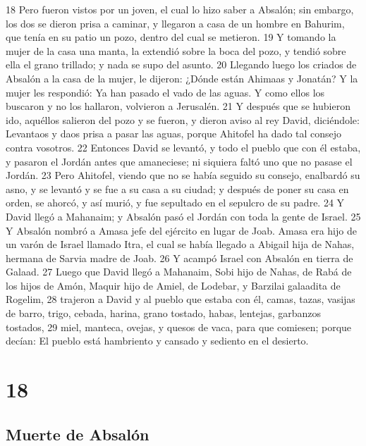 18 Pero fueron vistos por un joven, el cual lo hizo saber a Absalón; sin embargo, los dos se dieron prisa a caminar, y llegaron a casa de un hombre en Bahurim, que tenía en su patio un pozo, dentro del cual se metieron.
19 Y tomando la mujer de la casa una manta, la extendió sobre la boca del pozo, y tendió sobre ella el grano trillado; y nada se supo del asunto.
20 Llegando luego los criados de Absalón a la casa de la mujer, le dijeron: ¿Dónde están Ahimaas y Jonatán? Y la mujer les respondió: Ya han pasado el vado de las aguas. Y como ellos los buscaron y no los hallaron, volvieron a Jerusalén.
21 Y después que se hubieron ido, aquéllos salieron del pozo y se fueron, y dieron aviso al rey David, diciéndole: Levantaos y daos prisa a pasar las aguas, porque Ahitofel ha dado tal consejo contra vosotros.
22 Entonces David se levantó, y todo el pueblo que con él estaba, y pasaron el Jordán antes que amaneciese; ni siquiera faltó uno que no pasase el Jordán.
23 Pero Ahitofel, viendo que no se había seguido su consejo, enalbardó su asno, y se levantó y se fue a su casa a su ciudad; y después de poner su casa en orden, se ahorcó, y así murió, y fue sepultado en el sepulcro de su padre. 
24 Y David llegó a Mahanaim; y Absalón pasó el Jordán con toda la gente de Israel.
25 Y Absalón nombró a Amasa jefe del ejército en lugar de Joab. Amasa era hijo de un varón de Israel llamado Itra, el cual se había llegado a Abigail hija de Nahas, hermana de Sarvia madre de Joab.
26 Y acampó Israel con Absalón en tierra de Galaad.
27 Luego que David llegó a Mahanaim, Sobi hijo de Nahas, de Rabá de los hijos de Amón, Maquir hijo de Amiel, de Lodebar, y Barzilai galaadita de Rogelim,
28 trajeron a David y al pueblo que estaba con él, camas, tazas, vasijas de barro, trigo, cebada, harina, grano tostado, habas, lentejas, garbanzos tostados,
29 miel, manteca, ovejas, y quesos de vaca, para que comiesen; porque decían: El pueblo está hambriento y cansado y sediento en el desierto.

\chapter{18}

\section*{Muerte de Absalón}

